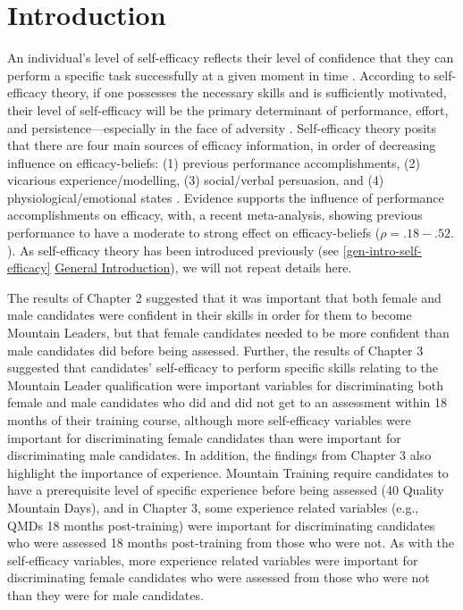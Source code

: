 \documentclass[
  12pt,
  a4paper,
]{book}
\begin{document}
\hypertarget{chapter-4-introduction}{%
\section{Introduction}\label{chapter-4-introduction}}

An individual's level of self-efficacy reflects their level of confidence that they can perform a specific task successfully at a given moment in time \citep{Bandura1977}. According to self-efficacy theory, if one possesses the necessary skills and is sufficiently motivated, their level of self-efficacy will be the primary determinant of performance, effort, and persistence---especially in the face of adversity \citep{Bandura1977, Bandura1982, Bandura1997}. Self-efficacy theory posits that there are four main sources of efficacy information, in order of decreasing influence on efficacy-beliefs: (1) previous performance accomplishments, (2) vicarious experience/modelling, (3) social/verbal persuasion, and (4) physiological/emotional states \citep{Bandura1982}. Evidence supports the influence of performance accomplishments on efficacy, with, a recent meta-analysis, \citet{Sitzmann2013} showing previous performance to have a moderate to strong effect on efficacy-beliefs (\(\rho = .18-.52.\)). As self-efficacy theory has been introduced previously (see \ref{gen-intro-self-efficacy} \protect\hyperlink{gen-intro-self-efficacy}{General Introduction}), we will not repeat details here.

The results of Chapter 2 suggested that it was important that both female and male candidates were confident in their skills in order for them to become Mountain Leaders, but that female candidates needed to be more confident than male candidates did before being assessed. Further, the results of Chapter 3 suggested that candidates' self-efficacy to perform specific skills relating to the Mountain Leader qualification were important variables for discriminating both female and male candidates who did and did not get to an assessment within 18 months of their training course, although more self-efficacy variables were important for discriminating female candidates than were important for discriminating male candidates. In addition, the findings from Chapter 3 also highlight the importance of experience. Mountain Training require candidates to have a prerequisite level of specific experience before being assessed (40 Quality Mountain Days), and in Chapter 3, some experience related variables (e.g., QMDs 18 months post-training) were important for discriminating candidates who were assessed 18 months post-training from those who were not. As with the self-efficacy variables, more experience related variables were important for discriminating female candidates who were assessed from those who were not than they were for male candidates.
\end{document}
